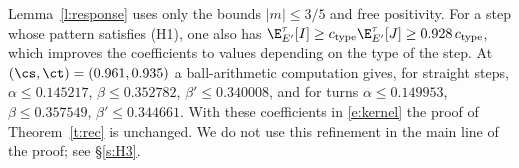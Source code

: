 \begin{remark}\label{r:typedep}
Lemma~\ref{l:response} uses only the bounds $|m| \le 3/5$ and free positivity. For a step whose pattern satisfies (H1), one also has $\E^\tau_{E'}[I] \ge c_{\mathrm{type}} \E^\tau_{E'}[J] \ge 0.928 \, c_{\mathrm{type}}$, which improves the coefficients to values depending on the type of the step. At $(\cs, \ct) = (0.961, 0.935)$ a ball-arithmetic computation gives, for straight steps, $\alpha \le 0.145217$, $\beta \le 0.352782$, $\beta' \le 0.340008$, and for turns $\alpha \le 0.149953$, $\beta \le 0.357549$, $\beta' \le 0.344661$. With these coefficients in \eqref{e:kernel} the proof of Theorem~\ref{t:rec} is unchanged. We do not use this refinement in the main line of the proof; see \S\ref{s:H3}.
\end{remark}
